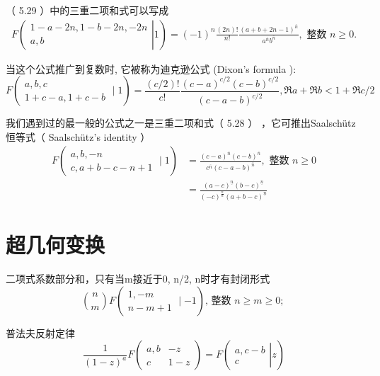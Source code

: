 （ 5.29 ）中的三重二项和式可以写成
\begin{align*}
F \left(\left.\begin{array}{c}
    1-a-2 n, 1-b-2 n,-2 n \\
    a, b
    \end{array}\right| 1 \right) =(-1)^{n} \frac{(2 n) !}{n !} \frac{(a+b+2 n-1)^{\bar{n}}}{a^{\bar{n}} b^{\bar{n}}}, \text { 整数 } n \geqslant 0 .
\end{align*}

当这个公式推广到复数时, 它被称为迪克逊公式 (Dixon's formula ):
\setcounter{equation}{95}
\begin{equation}
    F\left(\begin{array}{c}
    a, b, c \\
    1+c-a, 1+c-b
    \end{array} \mid 1\right)=\frac{(c / 2) !}{c !} \frac{(c-a)^{c / 2}(c-b)^{c / 2}}{(c-a-b)^{c / 2}}, \Re a+\Re b<1+\Re c / 2
\end{equation}

我们遇到过的最一般的公式之一是三重二项和式（ 5.28 ） ，它可推出Saalschütz恒等式（ Saalschütz’s identity ）
\begin{equation}
    \begin{aligned}
    F\left(\begin{array}{c}
    a, b,-n \\
    c, a+b-c-n+1
    \end{array} \mid 1\right) &=\frac{(c-a)^{\bar{n}}(c-b)^{\bar{n}}}{c^{\bar{n}}(c-a-b)^{\bar{n}}}, \text { 整数 } n \geqslant 0 \\
    &=\frac{(a-c)^{\underline{n}}(b-c)^{\underline{n}}}{(-c)^{\frac{n}{n}}(a+b-c)^{\underline{n}}}
    \end{aligned}
\end{equation}

\section{超几何变换}
\setcounter{equation}{99}
二项式系数部分和，只有当m接近于0, n/2, n时才有封闭形式
\begin{equation}
    {n \choose m} F\left(\begin{array}{c}
    1,-m \\
    n-m+1
    \end{array} \mid-1\right) \text {, 整数 } n \geqslant m \geqslant 0 \text {; }
\end{equation}

普法夫反射定律
\begin{equation}
    \frac{1}{(1-z)^{a}} F\left(\begin{array}{c|c}
        a, b & -z \\
        c & 1-z
        \end{array}\right)=F\left(\left.\begin{array}{c}
        a, c-b \\
        c
    \end{array}\right| z\right)
\end{equation}

